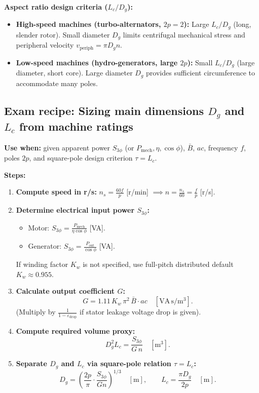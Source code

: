 \textbf{Aspect ratio design criteria ($L_c / D_g$):}
\begin{itemize}
  \item \textbf{High-speed machines (turbo-alternators, $2p=2$):} Large $L_c/D_g$ (long, slender rotor). Small diameter $D_g$ limits centrifugal mechanical stress and peripheral velocity $v_{\mathrm{periph}} = \pi D_g n$.
  \item \textbf{Low-speed machines (hydro-generators, large $2p$):} Small $L_c/D_g$ (large diameter, short core). Large diameter $D_g$ provides sufficient circumference to accommodate many poles.
\end{itemize}

\subsection{Exam recipe: Sizing main dimensions $D_g$ and $L_c$ from machine ratings}
\textbf{Use when:} given apparent power $S_{3\phi}$ (or $P_{\mathrm{mech}},\eta,\cos\phi$), $\bar{B}$, $ac$, frequency $f$, poles $2p$, and square-pole design criterion $\tau = L_c$.

\textbf{Steps:}
\begin{enumerate}
  \item \textbf{Compute speed in r/s:} $n_s = \frac{60 f}{p}$ [r/min] $\implies n = \frac{n_s}{60} = \frac{f}{p}$ [r/s].
  \item \textbf{Determine electrical input power $S_{3\phi}$:}
  \begin{itemize}
    \item Motor: $S_{3\phi} = \frac{P_{\mathrm{mech}}}{\eta\cos\phi}$ [VA].
    \item Generator: $S_{3\phi} = \frac{P_{\mathrm{out}}}{\cos\phi}$ [VA].
  \end{itemize}
  If winding factor $K_w$ is not specified, use full-pitch distributed default $K_w \approx 0.955$.
  \item \textbf{Calculate output coefficient $G$:}
  \[
  G = 1.11\,K_w\,\pi^2\,\bar{B}\cdot ac\quad[\mathrm{VA\,s/m^3}].
  \]
  (Multiply by $\frac{1}{1-\varepsilon_{\mathrm{drop}}}$ if stator leakage voltage drop is given).
  \item \textbf{Compute required volume proxy:}
  \[
  D_g^2 L_c = \frac{S_{3\phi}}{G\,n}\quad[\mathrm{m^3}].
  \]
  \item \textbf{Separate $D_g$ and $L_c$ via square-pole relation $\tau = L_c$:}
  \[
  D_g = \left(\frac{2p}{\pi}\cdot\frac{S_{3\phi}}{G n}\right)^{1/3}\quad[\mathrm{m}],
  \qquad
  L_c = \frac{\pi D_g}{2p}\quad[\mathrm{m}].
  \]
\end{enumerate}

